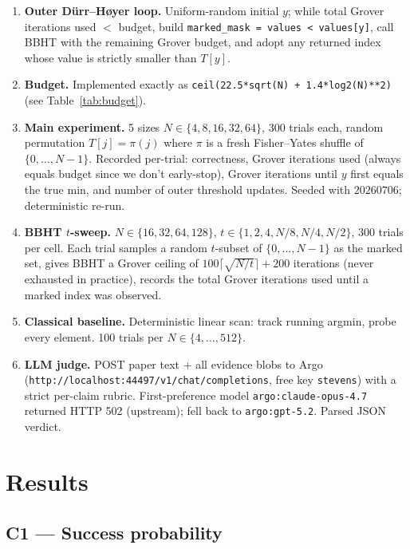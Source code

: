 \documentclass[11pt]{article}
\begin{document}
\begin{enumerate}
    \item \textbf{Outer D\"urr--H\o yer loop.}
    Uniform-random initial $y$; while total Grover iterations used $<$ budget,
    build \verb|marked_mask = values < values[y]|, call BBHT with the remaining
    Grover budget, and adopt any returned index whose value is strictly smaller
    than $T[y]$.

    \item \textbf{Budget.}
    Implemented exactly as \verb|ceil(22.5*sqrt(N) + 1.4*log2(N)**2)|
    (see Table~\ref{tab:budget}).

    \item \textbf{Main experiment.}
    5 sizes $N \in \{4,8,16,32,64\}$, 300 trials each, random permutation
    $T[j] = \pi(j)$ where $\pi$ is a fresh Fisher--Yates shuffle of
    $\{0,\dots,N-1\}$. Recorded per-trial: correctness, Grover iterations used
    (always equals budget since we don't early-stop), Grover iterations until $y$
    first equals the true min, and number of outer threshold updates.
    Seeded with $20260706$; deterministic re-run.

    \item \textbf{BBHT $t$-sweep.}
    $N \in \{16, 32, 64, 128\}$, $t \in \{1, 2, 4, N/8, N/4, N/2\}$, 300 trials
    per cell. Each trial samples a random $t$-subset of $\{0,\dots,N-1\}$ as the
    marked set, gives BBHT a Grover ceiling of $100\lceil\sqrt{N/t}\rceil + 200$
    iterations (never exhausted in practice), records the total Grover iterations
    used until a marked index was observed.

    \item \textbf{Classical baseline.}
    Deterministic linear scan: track running argmin, probe every element.
    100 trials per $N \in \{4,\dots,512\}$.

    \item \textbf{LLM judge.}
    POST paper text + all evidence blobs to Argo
    (\verb|http://localhost:44497/v1/chat/completions|, free key \verb|stevens|)
    with a strict per-claim rubric. First-preference model
    \verb|argo:claude-opus-4.7| returned HTTP 502 (upstream); fell back to
    \verb|argo:gpt-5.2|. Parsed JSON verdict.
\end{enumerate}

\section{Results}

\subsection{C1 --- Success probability}
\end{document}
